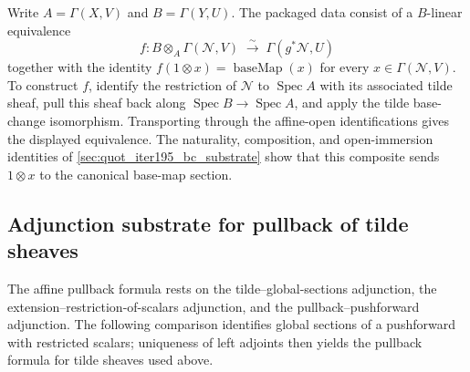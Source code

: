 \begin{definition}\leanok
  \label{def:pullback_app_isoTensor_sigma}
  Write \(A=\Gamma(X,V)\) and \(B=\Gamma(Y,U)\). The packaged data consist
  of a \(B\)-linear equivalence
  \[
    f : B\otimes_A\Gamma(\mathcal N,V)
      \;\xrightarrow{\sim}\; \Gamma(g^*\mathcal N,U)
  \]
  together with the identity
  \(f(1\otimes x)=\operatorname{baseMap}(x)\) for every
  \(x\in\Gamma(\mathcal N,V)\). To construct \(f\), identify the
  restriction of \(\mathcal N\) to \(\operatorname{Spec} A\) with its
  associated tilde sheaf, pull this sheaf back along
  \(\operatorname{Spec} B\to\operatorname{Spec} A\), and apply the tilde
  base-change isomorphism. Transporting through the affine-open
  identifications gives the displayed equivalence. The naturality,
  composition, and open-immersion identities of
  \cref{sec:quot_iter195_bc_substrate} show that this composite sends
  \(1\otimes x\) to the canonical base-map section.
\end{definition}

\subsection{Adjunction substrate for pullback of tilde sheaves}
\label{sec:quot_analogist_gaps}

The affine pullback formula rests on the tilde--global-sections adjunction,
the extension--restriction-of-scalars adjunction, and the
pullback--pushforward adjunction. The following comparison identifies global
sections of a pushforward with restricted scalars; uniqueness of left
adjoints then yields the pullback formula for tilde sheaves used above.

